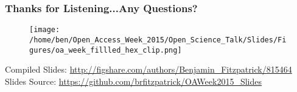 \documentclass[xcolor=dvipsnames]{beamer}
\begin{document}
\begin{frame}
\frametitle{Thanks for Listening...Any Questions?}
\begin{center}
\begin{figure}
\texttt{[image: /home/ben/Open\_Access\_Week\_2015/Open\_Science\_Talk/Slides/Figures/oa\_week\_fillled\_hex\_clip.png]}
\end{figure}
\end{center}
\end{frame}

\begin{frame}
Compiled Slides:
\small \url{http://figshare.com/authors/Benjamin_Fitzpatrick/815464}
\newline
\newline
Slides Source:
\small \url{https://github.com/brfitzpatrick/OAWeek2015_Slides}
\end{frame}
\end{document}
